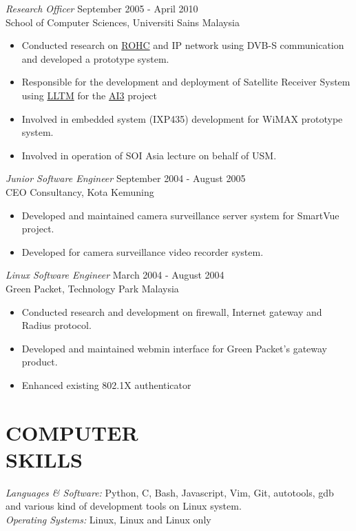 \documentclass[margin]{res}
\begin{document}
\begin{resume}
                {\sl Research Officer} \hfill            September 2005 - April 2010 \\
                School of Computer Sciences, Universiti Sains Malaysia
                 \begin{itemize}  \itemsep -2pt %
		 \item Conducted research on \href{http://tools.ietf.org/html/rfc3095}{ROHC} and IP network using DVB-S communication
				 and developed a prototype system.
		 \item Responsible for the development and deployment of Satellite Receiver System using 
			 \href{http://tools.ietf.org/html/rfc3077}{LLTM} for the \href{http://www.ai3.net}{AI3} project
		 \item Involved in embedded system (IXP435) development for WiMAX prototype system.
		 \item Involved in operation of SOI Asia lecture on behalf of USM.
                 \end{itemize} 
                {\sl Junior Software Engineer} \hfill        September 2004 - August 2005 \\
                 CEO Consultancy, Kota Kemuning
                  \begin{itemize}
                   \item Developed and maintained camera surveillance server system for SmartVue project.
	           \item Developed for camera surveillance video recorder system.
                   \end{itemize} 
 		{\sl Linux Software Engineer} \hfill        March 2004 -  August 2004 \\
                 Green Packet, Technology Park Malaysia
                  \begin{itemize}
                   \item Conducted research and development on firewall, Internet gateway and Radius protocol.
	           \item Developed and maintained webmin interface for Green Packet's gateway product.
		   \item Enhanced existing 802.1X authenticator
                   \end{itemize} 
\section{COMPUTER \\ SKILLS} {\sl Languages \& Software:} Python, C, Bash, Javascript, Vim, Git, autotools, gdb and various kind of development tools on Linux system.\\
                {\sl Operating Systems:} Linux, Linux and Linux only
	\end{resume} 
\end{document}
